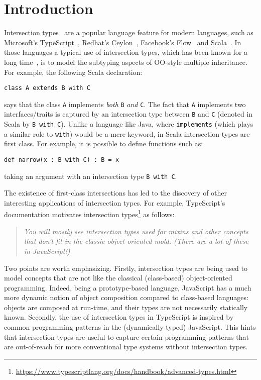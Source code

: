 \section{Introduction}
\label{sec:intro}

Intersection types~\cite{coppo1981functional,Pottinger80type} are a popular language feature for
modern languages, such as Microsoft's TypeScript~\cite{typescript}, 
Redhat's Ceylon~\cite{ceylon}, Facebook's Flow~\cite{flow} and
Scala~\cite{scala-overview}.
In those languages a typical use of intersection
types, which has been known for a long time~\cite{comppier96}, 
is to model the subtyping aspects of OO-style multiple inheritance. 
For example, the following Scala declaration:

\begin{lstlisting}
class A extends B with C
\end{lstlisting}

\noindent says that the class \lstinline{A} implements \emph{both}
\lstinline{B} \emph{and} \lstinline{C}. The fact that \lstinline{A}
implements two interfaces/traits is captured by an intersection type
between \lstinline{B} and \lstinline{C} (denoted in Scala by
\lstinline{B with C}). Unlike a language like Java, where
\lstinline{implements} (which plays a similar role to
\lstinline{with}) would be a mere keyword, in Scala
intersection types are first class. For example, it is possible to define 
functions such as:

\begin{lstlisting}
def narrow(x : B with C) : B = x
\end{lstlisting}

\noindent taking an argument with an intersection
type \lstinline{B with C}. 

The existence of first-class intersections has led to the
discovery of other interesting applications of intersection types. 
For example, TypeScript's documentation motivates intersection
types\footnote{\url{https://www.typescriptlang.org/docs/handbook/advanced-types.html}}
as follows:

\begin{quote}
\emph{You will mostly see intersection types used for mixins and other
concepts that don’t fit in the classic object-oriented mold. (There are a lot of these in JavaScript!)}
\end{quote}

\noindent Two points are worth emphasizing. Firstly, 
intersection types are being used to model concepts that are not
like the classical (class-based) object-oriented programming. Indeed, 
being a prototype-based language, JavaScript has a much more dynamic 
notion of object composition compared to class-based languages:
objects are composed at run-time, and their types are not necessarily
statically known. Secondly, the use of intersection types in
TypeScript is inspired by common programming patterns in the
(dynamically typed) JavaScript. This hints that intersection types are 
useful to capture certain programming patterns that are out-of-reach for
more conventional type systems without intersection types.

